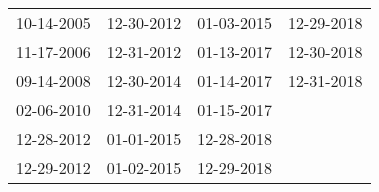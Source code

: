 \begin{supertabular}{llll}
 10-14-2005 &  12-30-2012 &  01-03-2015 &  12-29-2018 \\
 11-17-2006 &  12-31-2012 &  01-13-2017 &  12-30-2018 \\
 09-14-2008 &  12-30-2014 &  01-14-2017 &  12-31-2018 \\
 02-06-2010 &  12-31-2014 &  01-15-2017 &             \\
 12-28-2012 &  01-01-2015 &  12-28-2018 &             \\
 12-29-2012 &  01-02-2015 &  12-29-2018 &             \\
\end{supertabular}
